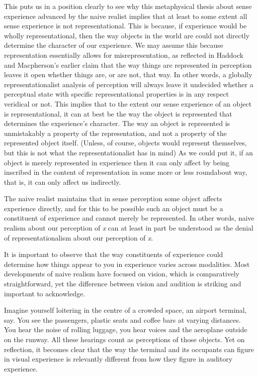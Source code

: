 \documentclass[sloppy, journal, git, bytitle, dodraft]{humapap}
\begin{document}
This puts us in a position clearly to see why this metaphysical thesis about sense experience advanced by the naive realist implies that at least to some extent all sense experience is not representational. This is because, if experience would be wholly representational, then the way objects in the world are could not directly determine the character of our experience. We may assume this because representation essentially allows for misrepresentation, as reflected in Haddock and Macpherson's earlier claim that the way things are represented in perception leaves it open whether things are, or are not, that way. In other words, a globally representationalist analysis of perception will always leave it undecided whether a  perceptual state with specific representational properties is in any respect veridical or not. This implies that to the extent our sense experience of an object is representational, it can at best be the way the object is represented that determines the experience's character. The way an object is represented is unmistakably a property of the representation, and not a property of the represented object itself. (Unless, of course, objects would represent themselves, but this is not what the representationalist has in mind) As we could put it, if an object is merely represented in experience then it can only affect by being inscribed in the content of representation in some more or less roundabout way, that is, it can only affect us indirectly. 

The naive realist maintains that in sense perception some object affects experience directly, and for this to be possible such an object must be a constituent of experience and cannot merely be represented. In other words, naive realism about our perception of \emph{x} can at least in part be understood as the denial of representationalism about our perception of  \emph{x}.

\sect It is important to observe that the way constituents of experience could determine how things appear to you in experience varies across modalities. Most developments of naive realism have focused on vision, which is comparatively straightforward, yet the difference between vision and audition is striking and important to acknowledge. 

Imagine yourself loitering in the centre of a crowded space, an airport terminal, say. You see the passengers, plastic seats and coffee bars at varying distances. You hear the noise of rolling luggage, you hear voices and the aeroplane outside on the runway. All these hearings count as perceptions of those objects. Yet on reflection, it becomes clear that the way the terminal and its occupants can figure in visual experience is relevantly different from how they figure in auditory experience.
\end{document}

